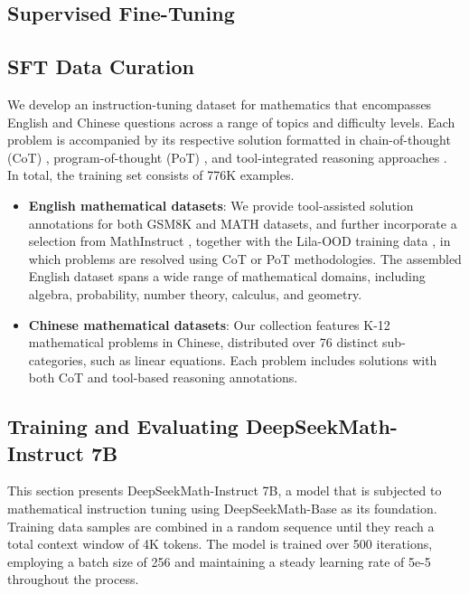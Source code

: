\begin{itemize}[topsep=0pt]
\section{Supervised Fine-Tuning}

\subsection{SFT Data Curation}

We develop an instruction-tuning dataset for mathematics that encompasses English and Chinese questions across a range of topics and difficulty levels. Each problem is accompanied by its respective solution formatted in chain-of-thought (CoT) \citep{cot}, program-of-thought (PoT) \citep{pot,pal}, and tool-integrated reasoning approaches \citep{tora}. In total, the training set consists of 776K examples.

\begin{itemize}[topsep=0pt]
    \item \textbf{English mathematical datasets}: We provide tool-assisted solution annotations for both GSM8K and MATH datasets, and further incorporate a selection from MathInstruct \citep{MathInstruct}, together with the Lila-OOD training data \citep{lila}, in which problems are resolved using CoT or PoT methodologies. The assembled English dataset spans a wide range of mathematical domains, including algebra, probability, number theory, calculus, and geometry.
    \item \textbf{Chinese mathematical datasets}: Our collection features K-12 mathematical problems in Chinese, distributed over 76 distinct sub-categories, such as linear equations. Each problem includes solutions with both CoT and tool-based reasoning annotations.
\end{itemize}

\subsection{Training and Evaluating DeepSeekMath-Instruct 7B}

This section presents DeepSeekMath-Instruct 7B, a model that is subjected to mathematical instruction tuning using DeepSeekMath-Base as its foundation. Training data samples are combined in a random sequence until they reach a total context window of 4K tokens. The model is trained over 500 iterations, employing a batch size of 256 and maintaining a steady learning rate of 5e-5 throughout the process.


\end{itemize}
